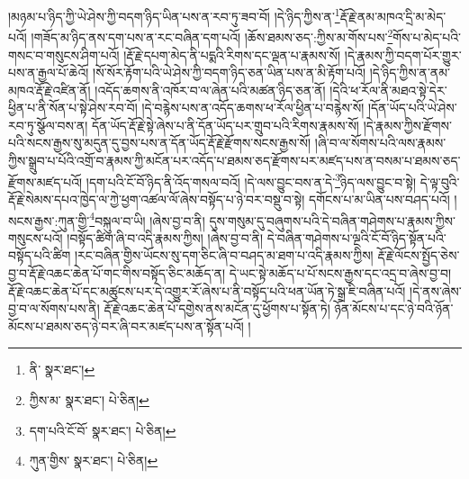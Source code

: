 །མཉམ་པ་ཉིད་ཀྱི་ཡེ་ཤེས་ཀྱི་བདག་ཉིད་ཡིན་པས་ན་རབ་ཏུ་ཟབ་བོ། །དེ་ཉིད་ཀྱིས་ན་\footnote{ནི་  སྣར་ཐང་། }རྡོ་རྗེ་ནམ་མཁའ་དྲི་མ་མེད་པའོ། །གཟོད་མ་ཉིད་ནས་དག་པས་ན་རང་བཞིན་དག་པའོ། །ཆོས་ཐམས་ཅད་:ཀྱིས་མ་གོས་པས་\footnote{ཀྱིས་མ་  སྣར་ཐང་།  པེ་ཅིན། }གོས་པ་མེད་པའི་གསང་བ་གསུངས་ཤིག་པའོ། །རྡོ་རྗེ་དཔག་མེད་ནི་པདྨའི་རིགས་དང་ལྡན་པ་རྣམས་སོ། །དེ་རྣམས་ཀྱི་བདག་པོར་གྱུར་པས་ན་རྒྱལ་པོ་ཆེའོ། །སོ་སོར་རྟོག་པའི་ཡེ་ཤེས་ཀྱི་བདག་ཉིད་ཅན་ཡིན་པས་ན་མི་རྟོག་པའོ། །དེ་ཉིད་ཀྱིས་ན་ནམ་མཁའ་རྡོ་རྗེ་འཛིན་ནོ། །འདོད་ཆགས་ནི་འཁོར་བ་ལ་ཞེན་པའི་མཚན་ཉིད་ཅན་ནོ། །དེའི་ཕ་རོལ་ནི་མཐའ་སྟེ་དེར་ཕྱིན་པ་ནི་སོན་པ་སྟེ་ཤེས་རབ་བོ། །དེ་བརྙེས་པས་ན་འདོད་ཆགས་ཕ་རོལ་ཕྱིན་པ་བརྙེས་སོ། །དོན་ཡོད་པའི་ཡེ་ཤེས་རབ་ཏུ་སྩོལ་བས་ན། དོན་ཡོད་རྡོ་རྗེ་སྟེ་ཞེས་པ་ནི་དོན་ཡོད་པར་གྲུབ་པའི་རིགས་རྣམས་སོ། །དེ་རྣམས་ཀྱིས་རྫོགས་པའི་སངས་རྒྱས་སུ་མདུན་དུ་བྱས་པས་ན་དོན་ཡོད་རྡོ་རྗེ་རྫོགས་སངས་རྒྱས་སོ། །ཞི་བ་ལ་སོགས་པའི་ལས་རྣམས་ཀྱིས་སྒྲུབ་པ་པོའི་འགྲོ་བ་རྣམས་ཀྱི་མངོན་པར་འདོད་པ་ཐམས་ཅད་རྫོགས་པར་མཛད་པས་ན་བསམ་པ་ཐམས་ཅད་རྫོགས་མཛད་པའོ། །དག་པའི་ངོ་བོ་ཉིད་ནི་འོད་གསལ་བའོ། །དེ་ལས་བྱུང་བས་ན་དེ་\footnote{དག་པའི་ངོ་བོ་  སྣར་ཐང་།  པེ་ཅིན། }ཉིད་ལས་བྱུང་བ་སྟེ། དེ་ལྟ་བུའི་རྡོ་རྗེ་སེམས་དཔའ་ཁྱེད་ལ་ཀྱེ་ཕྱག་འཚལ་ལོ་ཞེས་བསྟོད་པ་ཉེ་བར་བསྡུ་བ་སྟེ། དགོངས་པ་མ་ཡིན་པས་བཤད་པའོ། །སངས་རྒྱས་:ཀུན་གྱི་\footnote{ཀུན་གྱིས་  སྣར་ཐང་།  པེ་ཅིན། }བསྐུལ་བ་ཡི། །ཞེས་བྱ་བ་ནི། དུས་གསུམ་དུ་བཞུགས་པའི་དེ་བཞིན་གཤེགས་པ་རྣམས་ཀྱིས་གསུངས་པའོ། །བསྟོད་ཚིག་ཞི་བ་འདི་རྣམས་ཀྱིས། །ཞེས་བྱ་བ་ནི། དེ་བཞིན་གཤེགས་པ་ལྔའི་ངོ་བོ་ཉིད་སྟོན་པའི་བསྟོད་པའི་ཚིག །རང་བཞིན་གྱིས་ཡོངས་སུ་དག་ཅིང་ཞི་བ་བཤད་མ་ཐག་པ་འདི་རྣམས་ཀྱིས། རྡོ་རྗེ་ལོངས་སྤྱོད་ཅེས་བྱ་བ་རྡོ་རྗེ་འཆང་ཆེན་པོ་གང་གིས་བསྟོད་ཅིང་མཆོད་ན། དེ་ཡང་སྟེ་མཆོད་པ་པོ་སངས་རྒྱས་དང་འདྲ་བ་ཞེས་བྱ་བ། རྡོ་རྗེ་འཆང་ཆེན་པོ་དང་མཚུངས་པར་དེ་འགྱུར་རོ་ཞེས་པ་ནི་བསྟོད་པའི་ཕན་ཡོན་ཏེ་སྒྲ་ཇི་བཞིན་པའོ། །དེ་ནས་ཞེས་བྱ་བ་ལ་སོགས་པས་ནི། རྡོ་རྗེ་འཆང་ཆེན་པོ་དགྱེས་ནས་མངོན་དུ་ཕྱོགས་པ་སྟོན་ཏེ། ཉོན་མོངས་པ་དང་ཉེ་བའི་ཉོན་མོངས་པ་ཐམས་ཅད་ཉེ་བར་ཞི་བར་མཛད་པས་ན་སྟོན་པའོ། །
